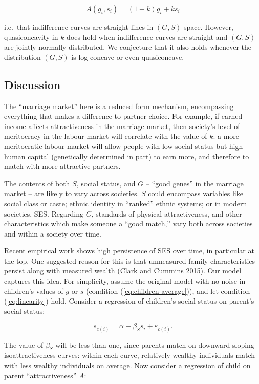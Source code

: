 \documentclass[
]{article}
\begin{document}
\begin{equation}
A(g_{i},s_{i}) = (1-k)g_{i} + ks_{i}
\label{eq:linearity}
\end{equation}

i.e.~that indifference curves are straight lines in \((G, S)\) space.
However, quasiconcavity in \(k\) does hold when indifference curves are
straight and \((G, S)\) are jointly normally distributed. We conjecture
that it also holds whenever the distribution \((G, S)\) is log-concave or
even quasiconcave.

\hypertarget{discussion}{%
\subsection{Discussion}\label{discussion}}

The ``marriage market'' here is a reduced form mechanism, encompassing
everything that makes a difference to partner choice. For example, if
earned income affects attractiveness in the marriage market, then
society's level of meritocracy in the labour market will correlate with
the value of \(k\): a more meritocratic labour market will allow people
with low social status but high human capital (genetically determined in
part) to earn more, and therefore to match with more attractive
partners.

The contents of both \(S\), social status, and \(G\) -- ``good genes'' in the
marriage market -- are likely to vary across societies. \(S\) could
encompass variables like social class or caste; ethnic identity in
``ranked'' ethnic systems; or in modern societies, SES. Regarding \(G\),
standards of physical attractiveness, and other characteristics which
make someone a ``good match,'' vary both across societies and within a
society over time.

Recent empirical work shows high persistence of SES over time, in
particular at the top. One suggested reason for this is that unmeasured
family characteristics persist along with measured wealth
(Clark and Cummins 2015). Our model captures this idea. For
simplicity, assume the original model with no noise in children's values
of \(g\) or \(s\) (condition (\eqref{eq:children-average})), and let
condition (\eqref{eq:linearity}) hold. Consider a regression of
children's social status on parent's social status:

\[
s_{c(i)} = \alpha + \beta_S s_i + \varepsilon_{c(i)}.
\]

The value of \(\beta_S\) will be less than one, since parents match on
downward sloping isoattractiveness curves: within each curve, relatively
wealthy individuals match with less wealthy individuals on average. Now
consider a regression of child on parent ``attractiveness'' \(A\):
\end{document}
